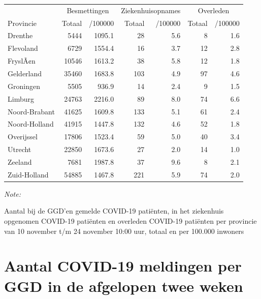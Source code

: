 \documentclass[
  english,
  man,floatsintext]{apa6}
\begin{document}
\begin{table}
\centering
\begin{threeparttable}
\begin{tabular}{lrrrrrr}
\toprule
\multicolumn{1}{c}{ } & \multicolumn{2}{c}{Besmettingen} & \multicolumn{2}{c}{Ziekenhuisopnames} & \multicolumn{2}{c}{Overleden} \\
\cmidrule(l{3pt}r{3pt}){2-3} \cmidrule(l{3pt}r{3pt}){4-5} \cmidrule(l{3pt}r{3pt}){6-7}
Provincie & Totaal & /100000 & Totaal & /100000 & Totaal & /100000\\
\midrule
Drenthe & 5444 & 1095.1 & 28 & 5.6 & 8 & 1.6\\
Flevoland & 6729 & 1554.4 & 16 & 3.7 & 12 & 2.8\\
FryslÃ¢n & 10546 & 1613.2 & 38 & 5.8 & 12 & 1.8\\
Gelderland & 35460 & 1683.8 & 103 & 4.9 & 97 & 4.6\\
Groningen & 5505 & 936.9 & 14 & 2.4 & 9 & 1.5\\
Limburg & 24763 & 2216.0 & 89 & 8.0 & 74 & 6.6\\
Noord-Brabant & 41625 & 1609.8 & 133 & 5.1 & 61 & 2.4\\
Noord-Holland & 41915 & 1447.8 & 132 & 4.6 & 52 & 1.8\\
Overijssel & 17806 & 1523.4 & 59 & 5.0 & 40 & 3.4\\
Utrecht & 22850 & 1673.6 & 27 & 2.0 & 14 & 1.0\\
Zeeland & 7681 & 1987.8 & 37 & 9.6 & 8 & 2.1\\
Zuid-Holland & 54885 & 1467.8 & 221 & 5.9 & 74 & 2.0\\
\bottomrule
\end{tabular}
\begin{tablenotes}
\item \textit{Note: } 
\item Aantal bij de GGD’en gemelde COVID-19 patiënten, in het ziekenhuis opgenomen COVID-19 patiënten en overleden COVID-19 patiënten per provincie van 10 november t/m 24 november 10:00 uur, totaal en per 100.000 inwoners
\end{tablenotes}
\end{threeparttable}
\end{table}

\newpage

\hypertarget{aantal-covid-19-meldingen-per-ggd-in-de-afgelopen-twee-weken}{%
\section{Aantal COVID-19 meldingen per GGD in de afgelopen twee weken}\label{aantal-covid-19-meldingen-per-ggd-in-de-afgelopen-twee-weken}}
\end{document}
